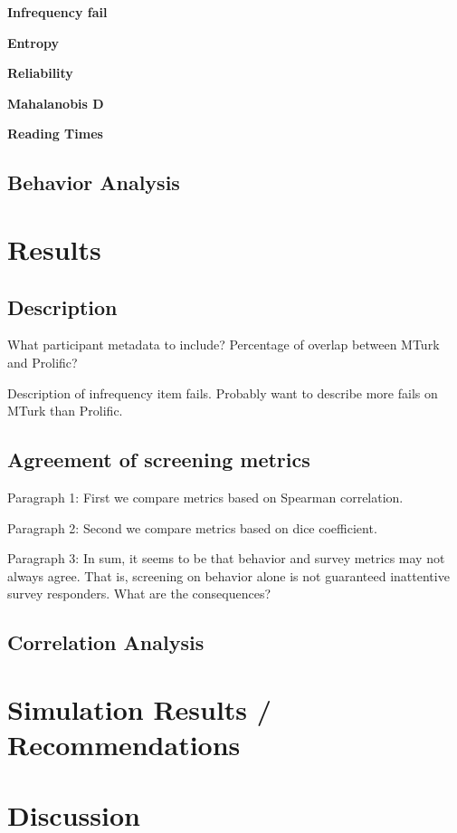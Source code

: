 \documentclass[a4paper,notitlepage,12pt]{article}
\begin{document}
\textbf{Infrequency fail}

\textbf{Entropy}

\textbf{Reliability}

\textbf{Mahalanobis D}

\textbf{Reading Times}

\subsection{Behavior Analysis}

\section{Results}

\subsection{Description}

What participant metadata to include? Percentage of overlap between MTurk and Prolific? 

Description of infrequency item fails. Probably want to describe more fails on MTurk than Prolific. 

\subsection{Agreement of screening metrics}

Paragraph 1: First we compare metrics based on Spearman correlation. 

Paragraph 2: Second we compare metrics based on dice coefficient.

Paragraph 3: In sum, it seems to be that behavior and survey metrics may not always agree. That is, screening on behavior alone is not guaranteed inattentive survey responders. What are the consequences? 

\subsection{Correlation Analysis}

\section{Simulation Results / Recommendations}

\section{Discussion}
\end{document}
